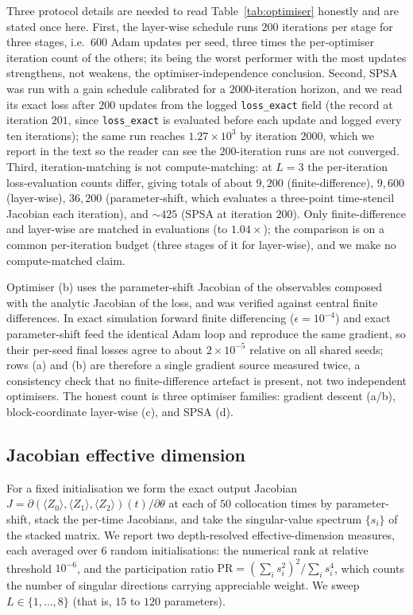 \documentclass[a4paper,12pt]{iopart}
\newcommand{\Zexp}[1]{\langle Z_{#1}\rangle}
\begin{document}
Three protocol details are needed to read Table~\ref{tab:optimiser} honestly and
are stated once here. First, the layer-wise schedule runs $200$ iterations per
stage for three stages, i.e.\ $600$ Adam updates per seed, three times the
per-optimiser iteration count of the others; its being the worst performer with
the most updates strengthens, not weakens, the optimiser-independence
conclusion. Second, SPSA was run with a gain schedule calibrated for a
$2000$-iteration horizon, and we read its exact loss after $200$ updates from
the logged \texttt{loss\_exact} field (the record at iteration $201$, since
\texttt{loss\_exact} is evaluated before each update and logged every ten
iterations); the same run reaches $1.27\times10^{3}$ by iteration $2000$, which
we report in the text so the reader can see the $200$-iteration runs are not
converged. Third, iteration-matching is not compute-matching: at $L=3$ the
per-iteration loss-evaluation counts differ, giving totals of about $9{,}200$
(finite-difference), $9{,}600$ (layer-wise), $36{,}200$ (parameter-shift, which
evaluates a three-point time-stencil Jacobian each iteration), and $\sim\!425$
(SPSA at iteration $200$). Only finite-difference and layer-wise are matched in
evaluations (to $1.04\times$); the comparison is on a common per-iteration
budget (three stages of it for layer-wise), and we make no compute-matched
claim.

Optimiser (b) uses the parameter-shift Jacobian of the observables composed with
the analytic Jacobian of the loss, and was verified against central finite
differences. In exact simulation forward finite differencing ($\epsilon=10^{-4}$)
and exact parameter-shift feed the identical Adam loop and reproduce the same
gradient, so their per-seed final losses agree to about $2\times10^{-5}$
relative on all shared seeds; rows (a) and (b) are therefore a single gradient
source measured twice, a consistency check that no finite-difference artefact is
present, not two independent optimisers. The honest count is three optimiser
families: gradient descent (a/b), block-coordinate layer-wise (c), and SPSA (d).

\subsection{Jacobian effective dimension}
\label{ssec:methods-jac}

For a fixed initialisation we form the exact output Jacobian
$J = \partial(\Zexp{0},\Zexp{1},\Zexp{2})(t)/\partial\theta$ at each of $50$
collocation times by parameter-shift, stack the per-time Jacobians, and take the
singular-value spectrum $\{s_i\}$ of the stacked matrix. We report two
depth-resolved effective-dimension measures, each averaged over $6$ random
initialisations: the numerical rank at relative threshold $10^{-6}$, and the
participation ratio $\mathrm{PR} = (\sum_i s_i^2)^2 / \sum_i s_i^4$, which counts
the number of singular directions carrying appreciable weight. We sweep
$L\in\{1,\dots,8\}$ (that is, $15$ to $120$ parameters).
\end{document}
